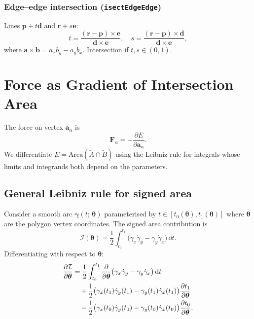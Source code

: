 \documentclass[12pt]{article}
\newcommand{\pderiv}[2]{\frac{\partial #1}{\partial #2}}
\begin{document}
\subsubsection{Edge–edge intersection (\texttt{isectEdgeEdge})}

Lines $\mathbf{p} + t\mathbf{d}$ and $\mathbf{r} + s\mathbf{e}$:
\[
  t = \frac{(\mathbf{r}-\mathbf{p})\times\mathbf{e}}{\mathbf{d}\times\mathbf{e}},
  \quad
  s = \frac{(\mathbf{r}-\mathbf{p})\times\mathbf{d}}{\mathbf{d}\times\mathbf{e}},
\]
where $\mathbf{a}\times\mathbf{b} = a_x b_y - a_y b_x$.  Intersection if $t, s \in (0,1)$.

\section{Force as Gradient of Intersection Area}

The force on vertex $\mathbf{a}_\alpha$ is
\[
  \mathbf{F}_\alpha = -\pderiv{E}{\mathbf{a}_\alpha}.
\]
We differentiate $E = \mathrm{Area}(\tilde A \cap \tilde B)$ using the Leibniz
rule for integrals whose limits and integrands both depend on the parameters.

\subsection{General Leibniz rule for signed area}

Consider a smooth arc $\boldsymbol{\gamma}(t;\,\boldsymbol{\theta})$ parameterised by
$t\in[t_0(\boldsymbol{\theta}), t_1(\boldsymbol{\theta})]$ where $\boldsymbol{\theta}$
are the polygon vertex coordinates.  The signed area contribution is
\[
  \mathcal{I}(\boldsymbol{\theta})
  = \frac{1}{2}\int_{t_0}^{t_1}
    \bigl(\gamma_x \dot\gamma_y - \gamma_y \dot\gamma_x\bigr)\,\dd t.
\]
Differentiating with respect to $\boldsymbol{\theta}$:
\begin{align}
  \pderiv{\mathcal{I}}{\boldsymbol{\theta}}
  &= \frac{1}{2}\int_{t_0}^{t_1}
     \pderiv{}{\boldsymbol{\theta}}\bigl(\gamma_x\dot\gamma_y - \gamma_y\dot\gamma_x\bigr)\,\dd t
  \notag\\
  &\quad+ \frac{1}{2}\bigl(\gamma_x(t_1)\dot\gamma_y(t_1)-\gamma_y(t_1)\dot\gamma_x(t_1)\bigr)
     \pderiv{t_1}{\boldsymbol{\theta}}
  \notag\\
  &\quad- \frac{1}{2}\bigl(\gamma_x(t_0)\dot\gamma_y(t_0)-\gamma_y(t_0)\dot\gamma_x(t_0)\bigr)
     \pderiv{t_0}{\boldsymbol{\theta}}.
  \label{eq:leibniz}
\end{align}
\end{document}
